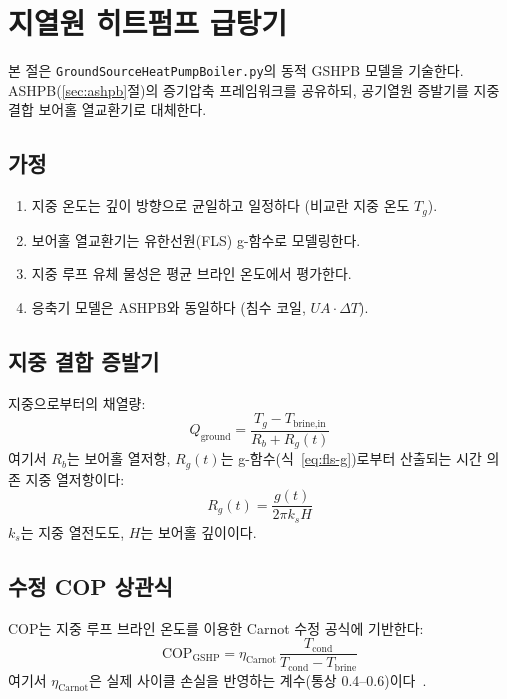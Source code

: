 \section{지열원 히트펌프 급탕기}
\label{sec:gshpb}

본 절은 \texttt{GroundSourceHeatPumpBoiler.py}의 동적 GSHPB 모델을 기술한다. ASHPB(\ref{sec:ashpb}절)의 증기압축 프레임워크를 공유하되, 공기열원 증발기를 지중 결합 보어홀 열교환기로 대체한다.

\subsection{가정}
\begin{enumerate}
  \item 지중 온도는 깊이 방향으로 균일하고 일정하다 (비교란 지중 온도 $T_g$).
  \item 보어홀 열교환기는 유한선원(FLS) g-함수로 모델링한다.
  \item 지중 루프 유체 물성은 평균 브라인 온도에서 평가한다.
  \item 응축기 모델은 ASHPB와 동일하다 (침수 코일, $UA\cdot\Delta T$).
\end{enumerate}

\subsection{지중 결합 증발기}

지중으로부터의 채열량:
\begin{equation}\label{eq:gshp-Qground}
  Q_\text{ground} = \frac{T_g - T_\text{brine,in}}{R_b + R_g(t)}
\end{equation}
여기서 $R_b$는 보어홀 열저항, $R_g(t)$는 g-함수(식~\ref{eq:fls-g})로부터 산출되는 시간 의존 지중 열저항이다:
\begin{equation}\label{eq:gshp-Rg}
  R_g(t) = \frac{g(t)}{2\pi k_s H}
\end{equation}
$k_s$는 지중 열전도도, $H$는 보어홀 깊이이다.

\subsection{수정 COP 상관식}

COP는 지중 루프 브라인 온도를 이용한 Carnot 수정 공식에 기반한다:
\begin{equation}\label{eq:gshp-COP}
  \text{COP}_\text{GSHP} = \eta_\text{Carnot}\,\frac{T_\text{cond}}{T_\text{cond} - T_\text{brine}}
\end{equation}
여기서 $\eta_\text{Carnot}$은 실제 사이클 손실을 반영하는 계수(통상 0.4--0.6)이다~\cite{sarbu2019}.

